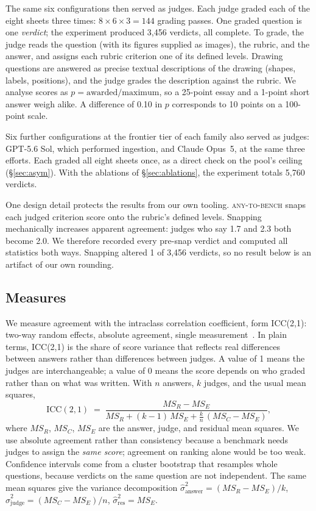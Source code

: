 \documentclass{article}
\newcommand{\num}[1]{#1}
\begin{document}
The same six configurations then served as judges. Each judge graded each of
the eight sheets three times: $8 \times 6 \times 3 = 144$ grading passes. One
graded question is one \emph{verdict}; the experiment produced 3{,}456
verdicts, all complete. To grade, the judge reads the question (with its
figures supplied as images), the rubric, and the answer, and assigns each
rubric criterion one of its defined levels. Drawing questions are answered as
precise textual descriptions of the drawing (shapes, labels, positions), and
the judge grades the description against the rubric. We analyse scores as
$p = \text{awarded}/\text{maximum}$, so a 25-point essay and a 1-point short
answer weigh alike. A difference of 0.10 in $p$ corresponds to 10 points on a
100-point scale.

Six further configurations at the frontier tier of each family also served
as judges: GPT-5.6 Sol, which performed ingestion, and Claude Opus~5, at the
same three efforts. Each graded all eight sheets once, as a direct check on
the pool's ceiling (\S\ref{sec:asym}). With the ablations of
\S\ref{sec:ablations}, the experiment totals 5{,}760 verdicts.

One design detail protects the results from our own tooling.
\textsc{any-to-bench} snaps each judged criterion score onto the rubric's
defined levels. Snapping mechanically increases apparent agreement: judges who
say 1.7 and 2.3 both become 2.0. We therefore recorded every pre-snap verdict
and computed all statistics both ways. Snapping altered \num{1 of 3{,}456}
verdicts, so no result below is an artifact of our own rounding.

\subsection{Measures}

We measure agreement with the intraclass correlation coefficient, form
ICC(2,1): two-way random effects, absolute agreement, single
measurement~\cite{shroutfleiss1979}. In plain terms, ICC(2,1) is the share of
score variance that reflects real differences between answers rather than
differences between judges. A value of 1 means the judges are interchangeable;
a value of 0 means the score depends on who graded rather than on what was
written. With
$n$ answers, $k$ judges, and the usual mean squares,
\begin{equation}
\text{ICC}(2,1) \;=\;
\frac{MS_R - MS_E}
     {MS_R + (k-1)\,MS_E + \tfrac{k}{n}\,(MS_C - MS_E)},
\label{eq:icc}
\end{equation}
where $MS_R$, $MS_C$, $MS_E$ are the answer, judge, and residual mean squares.
We use absolute agreement rather than consistency because a benchmark needs
judges to assign the \emph{same score}; agreement on ranking alone would be
too weak.
Confidence intervals come from a cluster bootstrap that resamples whole
questions, because verdicts on the same question are not independent. The same
mean squares give the variance decomposition
$\hat\sigma^2_{\text{answer}} = (MS_R - MS_E)/k$,
$\hat\sigma^2_{\text{judge}} = (MS_C - MS_E)/n$,
$\hat\sigma^2_{\text{res}} = MS_E$.
\end{document}
